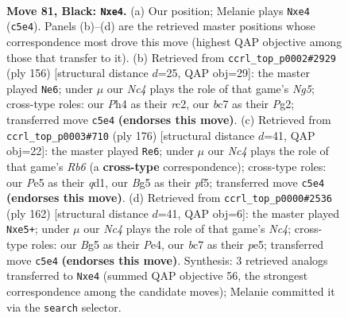 \documentclass[11pt]{article}
\begin{document}
\clearpage

\begin{figure}[p]\centering
\begin{subfigure}{0.46\textwidth}\centering
\resizebox{\linewidth}{!}{%
\newchessgame
\chessboard[
  setfen={8/2B5/3pk2p/2n1p1b1/2K1P2p/5r2/1R6/8 b - - 5 81},
  showmover=false,
  pgfstyle=straightmove, color=movearrow, markmove={c5-e4}
]}
\caption{}
\end{subfigure}\hfill
\begin{subfigure}{0.46\textwidth}\centering
\resizebox{\linewidth}{!}{%
\newchessgame
\chessboard[
  setfen={b2B4/7p/1P4k1/6N1/7P/5PK1/2r3P1/8 w - - 63 79},
  showmover=false,
  pgfstyle=straightmove, color=movearrow, markmove={g5-e6}
]}
\caption{}
\end{subfigure}
\\[4pt]
\begin{subfigure}{0.46\textwidth}\centering
\resizebox{\linewidth}{!}{%
\newchessgame
\chessboard[
  setfen={8/1pk5/1R6/2P2p2/8/5PP1/5BK1/3q4 w - - 33 89},
  showmover=false,
  pgfstyle=straightmove, color=movearrow, markmove={b6-e6}
]}
\caption{}
\end{subfigure}\hfill
\begin{subfigure}{0.46\textwidth}\centering
\resizebox{\linewidth}{!}{%
\newchessgame
\chessboard[
  setfen={8/8/2k5/p3p3/P1N1P3/1P1P4/1K6/3r4 w - - 16 82},
  showmover=false,
  pgfstyle=straightmove, color=movearrow, markmove={c4-e5}
]}
\caption{}
\end{subfigure}
\caption{\textbf{Move 81, Black: \texttt{Nxe4}.} (a) Our position; Melanie plays \texttt{Nxe4} (\texttt{c5e4}). Panels (b)--(d) are the retrieved master positions whose correspondence most drove this move (highest QAP objective among those that transfer to it). (b) Retrieved from \texttt{ccrl\_top\_p0002\#2929} (ply 156) [structural distance $d$=25, QAP obj=29]: the master played \texttt{Ne6}; under $\mu$ our \emph{Nc4} plays the role of that game's \emph{Ng5}; cross-type roles: our \emph{P}h4 as their \emph{r}c2, our \emph{b}c7 as their \emph{P}g2; transferred move \texttt{c5e4} \textbf{(endorses this move)}. (c) Retrieved from \texttt{ccrl\_top\_p0003\#710} (ply 176) [structural distance $d$=41, QAP obj=22]: the master played \texttt{Re6}; under $\mu$ our \emph{Nc4} plays the role of that game's \emph{Rb6} (a \textbf{cross-type} correspondence); cross-type roles: our \emph{P}e5 as their \emph{q}d1, our \emph{B}g5 as their \emph{p}f5; transferred move \texttt{c5e4} \textbf{(endorses this move)}. (d) Retrieved from \texttt{ccrl\_top\_p0000\#2536} (ply 162) [structural distance $d$=41, QAP obj=6]: the master played \texttt{Nxe5+}; under $\mu$ our \emph{Nc4} plays the role of that game's \emph{Nc4}; cross-type roles: our \emph{B}g5 as their \emph{P}e4, our \emph{b}c7 as their \emph{p}e5; transferred move \texttt{c5e4} \textbf{(endorses this move)}. Synthesis: 3 retrieved analogs transferred to \texttt{Nxe4} (summed QAP objective 56, the strongest correspondence among the candidate moves); Melanie committed it via the \texttt{search} selector.}
\label{fig:thought-m161}
\end{figure}
\end{document}
